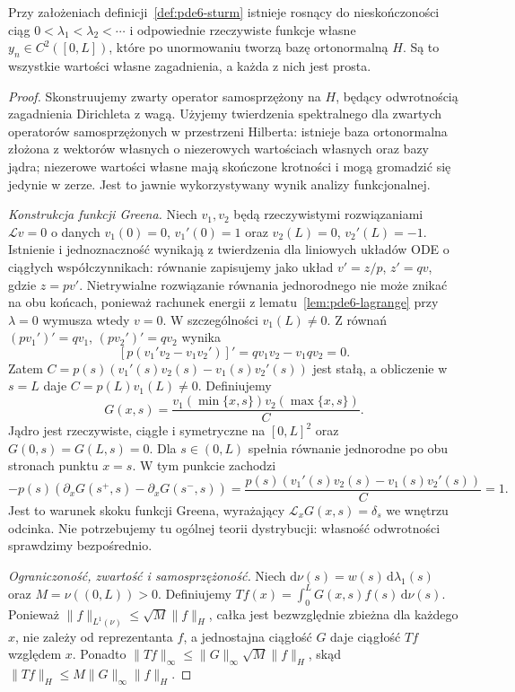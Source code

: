 \begin{twierdzenie}
\label{thm:pde6-sturm}
Przy założeniach definicji~\ref{def:pde6-sturm}
istnieje rosnący do nieskończoności ciąg
$0<\lambda_1<\lambda_2<\cdots$ i odpowiednie
rzeczywiste funkcje własne $y_n\in C^2([0,L])$,
które po unormowaniu tworzą bazę ortonormalną $H$.
Są to wszystkie wartości własne zagadnienia,
a każda z nich jest prosta.
\end{twierdzenie}
\begin{proof}
Skonstruujemy zwarty operator samosprzężony na $H$,
będący odwrotnością zagadnienia Dirichleta z wagą.
Użyjemy twierdzenia spektralnego dla zwartych
operatorów samosprzężonych w przestrzeni Hilberta:
istnieje baza ortonormalna złożona z wektorów własnych
o niezerowych wartościach własnych oraz bazy jądra;
niezerowe wartości własne mają skończone krotności
i mogą gromadzić się jedynie w zerze.
Jest to jawnie wykorzystywany wynik analizy funkcjonalnej.

\emph{Konstrukcja funkcji Greena.}
Niech $v_1,v_2$ będą rzeczywistymi rozwiązaniami
$\mathcal Lv=0$ o danych
$v_1(0)=0$, $v_1'(0)=1$ oraz
$v_2(L)=0$, $v_2'(L)=-1$.
Istnienie i jednoznaczność wynikają z twierdzenia
dla liniowych układów ODE o ciągłych współczynnikach:
równanie zapisujemy jako układ $v'=z/p$, $z'=qv$,
gdzie $z=pv'$.
Nietrywialne rozwiązanie równania jednorodnego
nie może znikać na obu końcach, ponieważ rachunek
energii z lematu~\ref{lem:pde6-lagrange} przy $\lambda=0$
wymusza wtedy $v=0$.
W szczególności $v_1(L)\ne0$.
Z równań $(pv_1')'=qv_1$, $(pv_2')'=qv_2$ wynika
\[
 [p(v_1'v_2-v_1v_2')]'=qv_1v_2-v_1qv_2=0.
\]
Zatem $C=p(s)(v_1'(s)v_2(s)-v_1(s)v_2'(s))$
jest stałą, a obliczenie w $s=L$ daje
$C=p(L)v_1(L)\ne0$.
Definiujemy
\begin{equation}\label{eq:pde6-green}
 G(x,s)=\frac{v_1(\min\{x,s\})v_2(\max\{x,s\})}{C}.
\end{equation}
Jądro jest rzeczywiste, ciągłe i symetryczne na
$[0,L]^2$ oraz $G(0,s)=G(L,s)=0$.
Dla $s\in(0,L)$ spełnia równanie jednorodne po obu
stronach punktu $x=s$. W tym punkcie zachodzi
\[
 -p(s)(\partial_xG(s^+,s)-\partial_xG(s^-,s))
 =\frac{p(s)(v_1'(s)v_2(s)-v_1(s)v_2'(s))}{C}=1.
\]
Jest to warunek skoku funkcji Greena, wyrażający
$\mathcal L_xG(x,s)=\delta_s$ we wnętrzu odcinka.
Nie potrzebujemy tu ogólnej teorii dystrybucji:
własność odwrotności sprawdzimy bezpośrednio.

\emph{Ograniczoność, zwartość i samosprzężoność.}
Niech $\mathrm d\nu(s)=w(s)\,\mathrm d\lambda_1(s)$
oraz $M=\nu((0,L))>0$. Definiujemy
$Tf(x)=\int_0^LG(x,s)f(s)\,\mathrm d\nu(s)$.
Ponieważ $\|f\|_{L^1(\nu)}\le\sqrt M\|f\|_H$,
całka jest bezwzględnie zbieżna dla każdego $x$,
nie zależy od reprezentanta $f$, a jednostajna
ciągłość $G$ daje ciągłość $Tf$ względem $x$.
Ponadto $\|Tf\|_\infty\le\|G\|_\infty\sqrt M\|f\|_H$,
skąd $\|Tf\|_H\le M\|G\|_\infty\|f\|_H$.


\end{proof}

